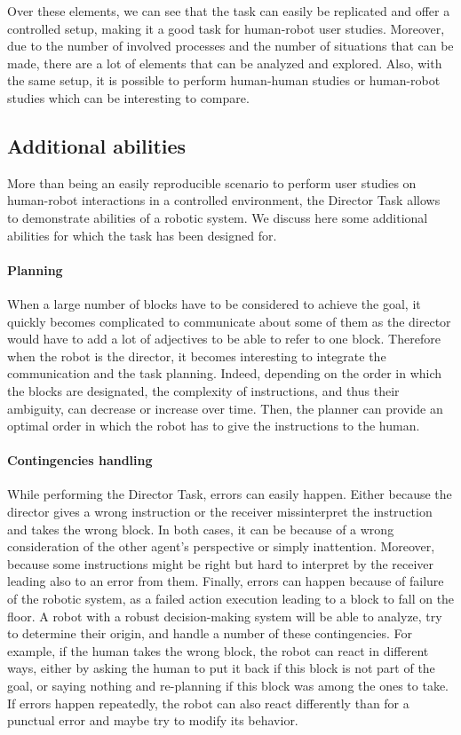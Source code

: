 Over these elements, we can see that the task can easily be replicated and offer a controlled setup, making it a good task for human-robot user studies. Moreover, due to the number of involved processes and the number of situations that can be made, there are a lot of elements that can be analyzed and explored. Also, with the same setup, it is possible to perform human-human studies or human-robot studies which can be interesting to compare.

\subsection{Additional abilities}

More than being an easily reproducible scenario to perform user studies on human-robot interactions in a controlled environment, the Director Task allows to demonstrate abilities of a robotic system. We discuss here some additional abilities for which the task has been designed for.

\paragraph{Planning} When a large number of blocks have to be considered to achieve the goal, it quickly becomes complicated to communicate about some of them as the director would have to add a lot of adjectives to be able to refer to one block. Therefore when the robot is the director, it becomes interesting to integrate the communication and the task planning. Indeed, depending on the order in which the blocks are designated, the complexity of instructions, and thus their ambiguity, can decrease or increase over time. Then, the planner can provide an optimal order in which the robot has to give the instructions to the human.

\paragraph{Contingencies handling} While performing the Director Task, errors can easily happen. Either because the director gives a wrong instruction or the receiver missinterpret the instruction and takes the wrong block. In both cases, it can be because of a wrong consideration of the other agent's perspective or simply inattention. Moreover, because some instructions might be right but hard to interpret by the receiver leading also to an error from them. Finally, errors can happen because of failure of the robotic system, as a failed action execution leading to a block to fall on the floor. A robot with a robust decision-making system will be able to analyze, try to determine their origin, and handle a number of these contingencies. For example, if the human takes the wrong block, the robot can react in different ways, either by asking the human to put it back if this block is not part of the goal, or saying nothing and re-planning if this block was among the ones to take. If errors happen repeatedly, the robot can also react differently than for a punctual error and maybe try to modify its behavior.

